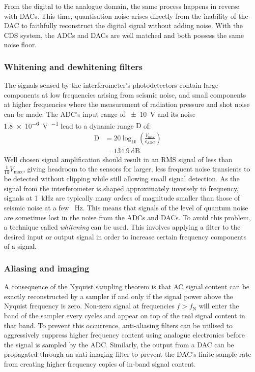 From the digital to the analogue domain, the same process happens in reverse with \glspl{DAC}. This time, quantisation noise arises directly from the inability of the \gls{DAC} to faithfully reconstruct the digital signal without adding noise. With the \gls{CDS} system, the \glspl{ADC} and \glspl{DAC} are well matched and both possess the same noise floor.

\subsubsection{Whitening and dewhitening filters}
The signals sensed by the interferometer's photodetectors contain large components at low frequencies arising from seismic noise, and small components at higher frequencies where the measurement of radiation pressure and shot noise can be made. The \gls{ADC}'s input range of \SI{\pm10}{\volt} and its noise \SI{1.8e-6}{\volt\per\sqrthz} lead to a dynamic range $\text{D}$ of:
\begin{equation}
  \begin{split}
    \text{D} &= 20 \log_{10} \left( \frac{V_{\text{max}}}{\epsilon_{\text{ADC}}} \right) \\
             &= \SI{134.9}{\deci\bel}.
  \end{split}
\end{equation}
Well chosen signal amplification should result in an \gls{RMS} signal of less than $\frac{1}{10} V_{\text{max}}$, giving headroom to the sensors for larger, less frequent noise transients to be detected without clipping while still allowing small signal detection. As the signal from the interferometer is shaped approximately inversely to frequency, signals at \SI{1}{\kilo\hertz} are typically many orders of magnitude smaller than those of seismic noise at a few \SI{}{\hertz}. This means that signals of the level of quantum noise are sometimes lost in the noise from the \glspl{ADC} and \glspl{DAC}. To avoid this problem, a technique called \emph{whitening} can be used. This involves applying a filter to the desired input or output signal in order to increase certain frequency components of a signal.


\subsubsection{Aliasing and imaging}

A consequence of the Nyquist sampling theorem is that \gls{AC} signal content can be exactly reconstructed by a sampler if and only if the signal power above the Nyquist frequency is zero. Non-zero signal at frequencies $f > f_{\text{N}}$ will enter the band of the sampler every  cycles and appear on top of the real signal content in that band. To prevent this occurrence, anti-aliasing filters can be utilised to aggressively suppress higher frequency content using analogue electronics before the signal is sampled by the \gls{ADC}. Similarly, the output from a \gls{DAC} can be propagated through an anti-imaging filter to prevent the \gls{DAC}'s finite sample rate from creating higher frequency copies of in-band signal content.

